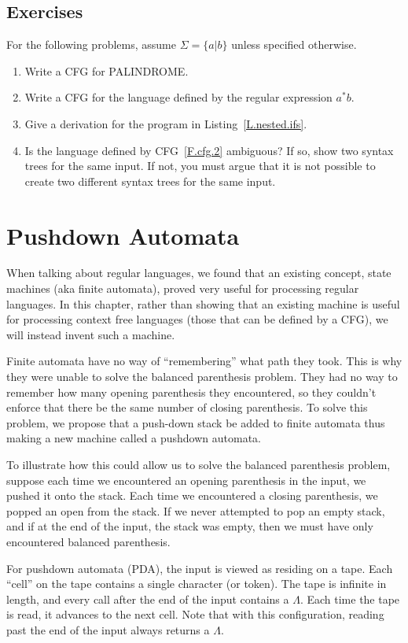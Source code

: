 \documentclass[letterpaper,12pt,openany,reqno]{book}%
\begin{document}
\section{Exercises}
For the following problems, assume $\Sigma = \{a|b\}$ unless specified otherwise.
\begin{enumerate}
\item Write a CFG for PALINDROME.
\item Write a CFG for the language defined by the regular expression $a^*b$.
\item Give a derivation for the program in Listing~\ref{L.nested.ifs}.
\item Is the language defined by CFG~\ref{F.cfg.2} ambiguous? If so, show two syntax trees for the same input. If not, you must argue that it is not possible to create two different syntax trees for the same input.
\end{enumerate}

\chapter{Pushdown Automata}
When talking about regular languages, we found that an existing concept, state machines (aka finite automata), proved very useful for processing regular languages. In this chapter, rather than showing that an existing machine is useful for processing context free languages (those that can be defined by a CFG), we will instead invent such a machine.

Finite automata have no way of ``remembering'' what path they took. This is why they were unable to solve the balanced parenthesis problem. They had no way to remember how many opening parenthesis they encountered, so they couldn't enforce that there be the same number of closing parenthesis. To solve this problem, we propose that a push-down stack be added to finite automata thus making a new machine called a pushdown automata.

To illustrate how this could allow us to solve the balanced parenthesis problem, suppose each time we encountered an opening parenthesis in the input, we pushed it onto the stack. Each time we encountered a closing parenthesis, we popped an open from the stack. If we never attempted to pop an empty stack, and if at the end of the input, the stack was empty, then we must have only encountered balanced parenthesis.

For pushdown automata (PDA), the input is viewed as residing on a tape. Each ``cell'' on the tape contains a single character (or token). The tape is infinite in length, and every call after the end of the input contains a $\Lambda$. Each time the tape is read, it advances to the next cell. Note that with this configuration, reading past the end of the input always returns a $\Lambda$.
\end{document}

